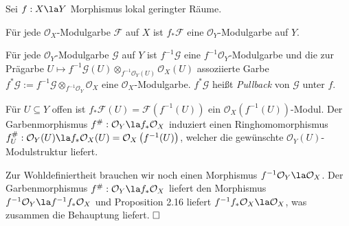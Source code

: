 \documentclass[11pt]{book}
\theoremstyle{nonumberbreak}
\newenvironment{pr}[1][]{\ifthenelse{\equal{#1}{}}{\proof}{\proof[#1]}\rm}{\endproof}
\newenvironment{bemdefin}[1][]{\ifthenelse{\equal{#1}{}}{\bemdefini}{\bemdefini[#1]}\rm}{\endbemdefini}
\newenvironment{definbem}[1][]{\ifthenelse{\equal{#1}{}}{\definibem}{\definibem[#1]}\rm}{\enddefinibem}
\begin{document}
\begin{spacing}{1.4}
\begin{definbem}
\end{definbem}


\begin{bemdefin}   %
Sei $f: X \la Y$ Morphismus lokal geringter Räume.
\begin{compactenum}
\item Für jede $\mathcal{O}_X$-Modulgarbe $\mathcal{F}$ auf $X$ ist $f_*\mathcal{F}$ eine $\mathcal{O}_Y$-Modulgarbe auf $Y$.
\item Für jede $\mathcal{O}_Y$-Modulgarbe $\mathcal{G}$ auf $Y$ ist $f^{-1} \mathcal{G}$ eine $f^{-1} \mathcal{O}_Y$-Modulgarbe und die zur Prägarbe $U \mapsto f^{-1}\mathcal{G}(U) \otimes_{f^{-1}\mathcal{O}_Y(U)} \mathcal{O}_X(U)$ assoziierte Garbe $f^*\mathcal{G} := f^{-1} \mathcal{G} \otimes_{f^{-1}\mathcal{O}_Y} \mathcal{O}_X$ eine $\mathcal{O}_X$-Modulgarbe. $f^*\mathcal{G}$ heißt \textit{Pullback} von $\mathcal{G}$ unter $f$.
\end{compactenum}
\begin{pr}
\begin{compactenum}
\item Für $U \subseteq Y$ offen ist $f_*\mathcal{F}(U)= \mathcal{F}\left(f^{-1}(U)\right)$ ein $\mathcal{O}_X\left(f^{-1}(U)\right)$-Modul. Der Garbenmorphismus $f^\#: \mathcal{O}_Y \la f_*\mathcal{O}_X$ induziert einen Ringhomomorphismus $f_U^\#: \mathcal{O}_Y(U) \la f_*\mathcal{O}_X(U) = \mathcal{O}_X\left(f^{-1}(U)\right)$, welcher die gewünschte $\mathcal{O}_Y(U)$-Modulstruktur liefert.
\item Zur Wohldefiniertheit brauchen wir noch einen Morphismus $f^{-1}\mathcal{O}_Y \la \mathcal{O}_X$. Der Garbenmorphismus $f^\#: \mathcal{O}_Y \la f_*\mathcal{O}_X$ liefert den Morphismus $f^{-1} \mathcal{O}_Y \la f^{-1}f_*\mathcal{O}_X$ und Proposition 2.16 liefert $f^{-1} f_* \mathcal{O}_X \la \mathcal{O}_X$, was zusammen die Behauptung liefert. $\hfill \Box$

\end{compactenum}


\end{pr}

\end{bemdefin}



\end{spacing}
\end{document}
